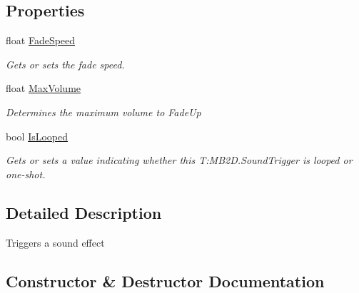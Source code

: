 \subsection*{Properties}
\begin{DoxyCompactItemize}
\item 
float \hyperlink{class_m_b2_d_1_1_sound_trigger_aff38429508a9f7d6d63e21ccb9605c16}{Fade\+Speed}
\begin{DoxyCompactList}\small\item\em Gets or sets the fade speed. \end{DoxyCompactList}\item 
float \hyperlink{class_m_b2_d_1_1_sound_trigger_a9b9555d5350b4f541e72adcee8f71e27}{Max\+Volume}
\begin{DoxyCompactList}\small\item\em Determines the maximum volume to Fade\+Up \end{DoxyCompactList}\item 
bool \hyperlink{class_m_b2_d_1_1_sound_trigger_a5b2cdaf1ced61a86af6a6b133e028a2f}{Is\+Looped}
\begin{DoxyCompactList}\small\item\em Gets or sets a value indicating whether this T\+:\+M\+B2\+D.\+Sound\+Trigger is looped or one-\/shot. \end{DoxyCompactList}\end{DoxyCompactItemize}


\subsection{Detailed Description}
Triggers a sound effect 



\subsection{Constructor \& Destructor Documentation}
\hypertarget{class_m_b2_d_1_1_sound_trigger_ae52791ea1d0f84f11dac81a8e7f34d64}{}\label{class_m_b2_d_1_1_sound_trigger_ae52791ea1d0f84f11dac81a8e7f34d64} 
